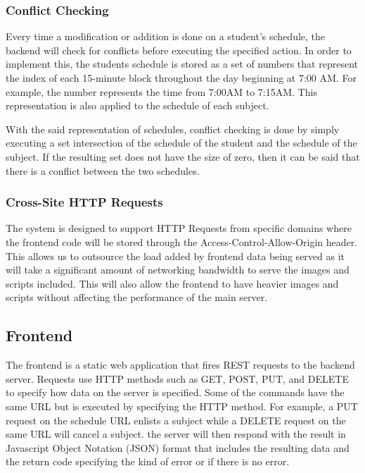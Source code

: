 \documentclass{sigchi}
\begin{document}
\subsubsection{Conflict Checking}

Every time a modification or addition is done on a student's schedule, the 
backend will check for conflicts before executing the specified action. 
In order to implement this, the students schedule is stored as a set of numbers
that represent the index of each 15-minute block throughout the day beginning at
7:00 AM. For example, the number represents the time from 7:00AM to 7:15AM. This
representation is also applied to the schedule of each subject. 

With the said representation of schedules, conflict checking is done by simply executing
a set intersection of the schedule of the student and the schedule of the subject. If the
resulting set does not have the size of zero, then it can be said that there is a conflict
between the two schedules.

\subsubsection{Cross-Site HTTP Requests}

The system is designed to support HTTP Requests from specific domains
where the frontend code will be stored through the Access-Control-Allow-Origin header. 
This allows us to outsource the load added by frontend data being served as 
it will take a significant amount of networking bandwidth to serve the images and
scripts included. This will also allow the frontend to have heavier images and 
scripts without affecting the performance of the main server. 

\subsection{Frontend}

The frontend is a static web application that fires REST requests to the
backend server. Requests use HTTP methods such as GET, POST, PUT, and DELETE to 
specify how data on the server is specified. Some of the commands have the same URL
but is executed by specifying the HTTP method. For example, a PUT request on the schedule
URL enlists a subject while a DELETE request on the same URL will cancel a subject. the
server will then respond with the result in Javascript Object Notation (JSON) format that
includes the resulting data and the return code specifying the kind of error or if there is
no error.
\end{document}
